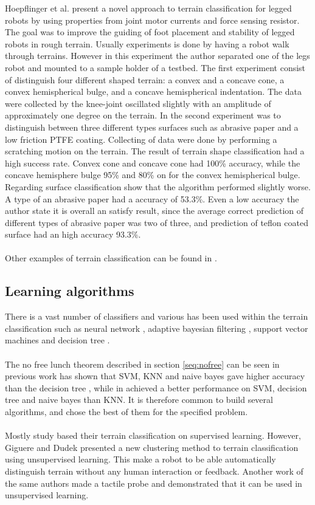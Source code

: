 \documentclass[USenglish]{ifimaster}  %
\begin{document}
Hoepflinger et al. \cite{5509309} present a novel approach to terrain classification for legged robots by using properties from joint motor currents and force sensing resistor. The goal was to improve the guiding of foot placement and stability of legged robots in rough terrain. Usually experiments is done by having a robot walk through terrains. However in this experiment the author separated one of the legs robot and mounted to a sample holder of a testbed. The first experiment consist of distinguish four different shaped terrain: a convex and a concave cone, a convex hemispherical bulge, and a concave hemispherical indentation. The data were collected by the knee-joint oscillated slightly with an amplitude of approximately one degree on the terrain. In the second experiment was to distinguish between three different types surfaces such as abrasive paper and a low friction PTFE coating. Collecting of data were done by performing a scratching motion on the terrain. The result of terrain shape classification had a high success rate. Convex cone and concave cone had 100\% accuracy, while the concave hemisphere bulge 95\% and 80\% on for the convex hemispherical bulge. Regarding surface classification show that the algorithm performed slightly worse. A type of an abrasive paper had a accuracy of 53.3\%. Even a low accuracy the author state it is overall an satisfy result, since the average correct prediction of different types of abrasive paper was two of three, and prediction of teflon coated surface had an high accuracy 93.3\%.
\\
\\
Other examples of terrain classification can be found in \cite{Giguere2009,6386243,6569179,4399500}.
	
\subsection{Learning algorithms}
There is a vast number of classifiers and various has been used within the terrain classification such as neural network \cite{6784609,5752869,4654717}, adaptive bayesian filtering \cite{5152327,6849778}, support vector machines \cite{5602459,4161556,4059113} and decision tree \cite{6849778}.
\\
\\
The no free lunch theorem described in section \ref{seq:nofree} can be seen in previous work has shown that SVM, KNN and naive bayes gave higher accuracy than the decision tree \cite{DBLP:conf/emcr/WeissFSZ07}, while in \cite{6849778} achieved a better performance on SVM, decision tree and naive bayes than KNN. It is therefore common to build several algorithms, and chose the best of them for the specified problem. 
\\
\\
Mostly study based their terrain classification on supervised learning. However, Giguere and Dudek \cite{Giguere2009} presented a new clustering method to terrain classification using unsupervised learning. This make a robot to be able automatically distinguish terrain without any human interaction or feedback. Another work of the same authors  \cite{5752869} made a tactile probe and demonstrated that it can be used in unsupervised learning.
	
\end{document}
